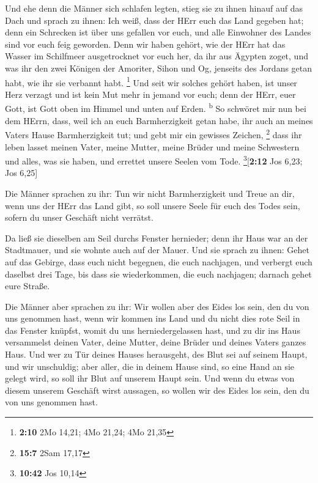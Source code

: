  Und ehe denn die Männer sich schlafen legten, stieg sie
zu ihnen hinauf auf das Dach  und sprach zu ihnen: Ich
weiß, dass der HErr euch das Land gegeben hat; denn ein Schrecken ist
über uns gefallen vor euch, und alle Einwohner des Landes sind vor euch
feig geworden.  Denn wir haben gehört, wie der HErr hat
das Wasser im Schilfmeer ausgetrocknet vor euch her, da ihr aus Ägypten
zoget, und was ihr den zwei Königen der Amoriter, Sihon und Og, jenseits
des Jordans getan habt, wie ihr sie verbannt habt. \footnote{\textbf{2:10}
  2Mo 14,21; 4Mo 21,24; 4Mo 21,35}  Und seit wir solches
gehört haben, ist unser Herz verzagt und ist kein Mut mehr in jemand vor
euch; denn der HErr, euer Gott, ist Gott oben im Himmel und unten auf
Erden. \textsuperscript{b}  So schwöret mir nun bei dem
HErrn, dass, weil ich an euch Barmherzigkeit getan habe, ihr auch an
meines Vaters Hause Barmherzigkeit tut; und gebt mir ein gewisses
Zeichen, \footnote{\textbf{15:7} 2Sam 17,17}  dass ihr
leben lasset meinen Vater, meine Mutter, meine Brüder und meine
Schwestern und alles, was sie haben, und errettet unsere Seelen vom
Tode. \footnote{\textbf{10:42} Jos 10,14}{[}\textbf{2:12} Jos 6,23; Jos
6,25{]}

 Die Männer sprachen zu ihr: Tun wir nicht Barmherzigkeit
und Treue an dir, wenn uns der HErr das Land gibt, so soll unsere Seele
für euch des Todes sein, sofern du unser Geschäft nicht verrätst.

 Da ließ sie dieselben am Seil durchs Fenster hernieder;
denn ihr Haus war an der Stadtmauer, und sie wohnte auch auf der Mauer.
 Und sie sprach zu ihnen: Gehet auf das Gebirge, dass
euch nicht begegnen, die euch nachjagen, und verbergt euch daselbst drei
Tage, bis dass sie wiederkommen, die euch nachjagen; darnach gehet eure
Straße.

 Die Männer aber sprachen zu ihr: Wir wollen aber des
Eides los sein, den du von uns genommen hast,  wenn wir
kommen ins Land und du nicht dies rote Seil in das Fenster knüpfst,
womit du uns herniedergelassen hast, und zu dir ins Haus versammelst
deinen Vater, deine Mutter, deine Brüder und deines Vaters ganzes Haus.
 Und wer zu Tür deines Hauses herausgeht, des Blut sei
auf seinem Haupt, und wir unschuldig; aber aller, die in deinem Hause
sind, so eine Hand an sie gelegt wird, so soll ihr Blut auf unserem
Haupt sein.  Und wenn du etwas von diesem unserem
Geschäft wirst aussagen, so wollen wir des Eides los sein, den du von
uns genommen hast.

